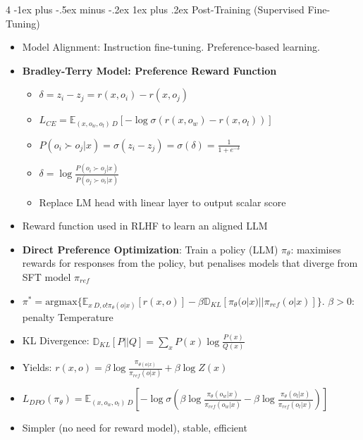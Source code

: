 \documentclass[10pt, landscape]{article}
\makeatletter
\renewcommand{\subsubsection}{\@startsection{subsubsection}{3}{0mm}%
  {-1ex plus -.5ex minus -.2ex}%
  {1ex plus .2ex}%
{\normalfont\small\bfseries}}%
\makeatother
\begin{document}
\begin{multicols*}{4}
  \subsubsection{Post-Training (Supervised Fine-Tuning)}
  \begin{itemize}
    \item Model Alignment: Instruction fine-tuning. Preference-based learning.
    \item \textbf{Bradley-Terry Model: Preference Reward Function}
    \begin{itemize}
      \item \( \delta = z_i - z_j = r(x,o_i) - r(x, o_j)\)
      \item $ L_{CE} = \mathbb{E}_{(x,o_w, o_l) ~ D} [- \log \sigma(r(x, o_w) - r(x, o_l))] $
      \item $ P(o_i \succ o_j|x) = \sigma(z_i - z_j) = \sigma(\delta) = \frac{1}{1+ e^{-\delta}}$
      \item $\delta = \log \frac{P(o_i \succ o_j|x)}{P(o_j \succ o_i | x)}$
      \item Replace LM head with linear layer to output scalar score
    \end{itemize}
    \item Reward function used in RLHF to learn an aligned LLM
    \item \textbf{Direct Preference Optimization}: Train a policy (LLM) $\pi_{\theta}$: maximises rewards for responses from the policy, but penalises models that diverge from SFT model $\pi_{ref}$
    \item \( \pi^* = \text{argmax}\{ \mathbb{E}_{x~D,o!\pi_{\theta}(o|x)}[r(x,o)] - \beta \mathbb{D}_{KL}[\pi_{\theta} (o|x)||\pi_{ref}(o|x)]\} \). $\beta > 0$: penalty Temperature
    \item KL Divergence: $\mathbb{D}_{KL}[P||Q] = \sum_x P(x) \log \frac{P(x)}{Q(x)}$
    \item Yields: $r(x,o) = \beta \log \frac{\pi_{\theta(o|x)}}{\pi_{ref}(o|x)} + \beta \log Z(x)$
    \item $L_{DPO}(\pi_{\theta}) = \mathbb{E}_{(x, o_w, o_l)~D} [- \log \sigma (\beta \log \frac{\pi_{\theta}(o_w|x)}{\pi_{ref}(o_w|x)} - \beta \log \frac{\pi_{\theta}(o_l|x)}{\pi_{ref}(o_l|x)}) ]$
    \item Simpler (no need for reward model), stable, efficient
  \end{itemize}


\end{multicols*}
\end{document}
